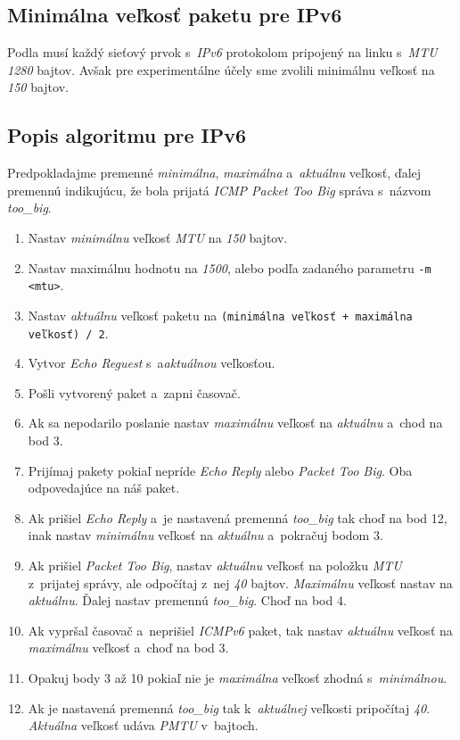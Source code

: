 \documentclass[12pt,a4paper,titlepage]{article}
\begin{document}
    \subsection{Minimálna veľkosť paketu pre IPv6} 
        Podla \cite{rfc_ipv6} musí každý sieťový prvok s~\emph{IPv6} protokolom pripojený
        na linku s~\emph{MTU 1280} bajtov. Avšak pre experimentálne účely sme zvolili minimálnu 
        veľkosť na \emph{150} bajtov.

    \subsection{Popis algoritmu pre IPv6} \label{algoritmus_ipv6} 
        Predpokladajme premenné \emph{minimálna}, \emph{maximálna} a~\emph{aktuálnu} veľkosť,
        ďalej premennú indikujúcu, že bola prijatá \emph{ICMP Packet Too Big} správa s~názvom \emph{too\_big}.

    \begin{enumerate}
        \item Nastav \emph{minimálnu} veľkosť \emph{MTU} na \emph{150} bajtov.
        \item Nastav maximálnu hodnotu na \emph{1500}, alebo podľa zadaného parametru \texttt{-m <mtu>}.
        \item Nastav \emph{aktuálnu} veľkosť paketu na \texttt{(minimálna veľkosť + maximálna veľkosť) / 2}.
        \item Vytvor \emph{Echo Reguest} s~a\emph{aktuálnou} veľkosťou.
        \item Pošli vytvorený paket a~zapni časovač.
        \item Ak sa nepodarilo poslanie nastav \emph{maximálnu} veľkosť na \emph{aktuálnu}
            a~chod na bod 3.
        \item Prijímaj pakety pokiaľ nepríde \emph{Echo Reply} alebo \emph{Packet Too Big}.
            Oba odpovedajúce na náš paket.
        \item Ak prišiel \emph{Echo Reply} a~je nastavená premenná \emph{too\_big} tak choď
            na bod 12, inak nastav \emph{minimálnu} veľkosť na \emph{aktuálnu} a~pokračuj
            bodom 3.
        \item Ak prišiel \emph{Packet Too Big}, nastav \emph{aktuálnu} veľkosť na položku
            \emph{MTU} z~prijatej správy, ale odpočítaj z~nej \emph{40} bajtov. \emph{Maximálnu}
            veľkosť nastav na \emph{aktuálnu}. Ďalej nastav
            premennú \emph{too\_big}. Choď na bod 4.
        \item Ak vypršal časovač a~neprišiel \emph{ICMPv6} paket, tak nastav \emph{aktuálnu}
            veľkosť na \emph{maximálnu} veľkosť a~choď na bod 3.
        \item Opakuj body 3 až 10 pokiaľ nie je \emph{maximálna} veľkosť zhodná s~\emph{minimálnou}.
        \item Ak je nastavená premenná \emph{too\_big} tak k~\emph{aktuálnej} veľkosti
            pripočítaj \emph{40}. \emph{Aktuálna} veľkosť udáva \emph{PMTU} v~bajtoch.
    \end{enumerate}
\end{document}
